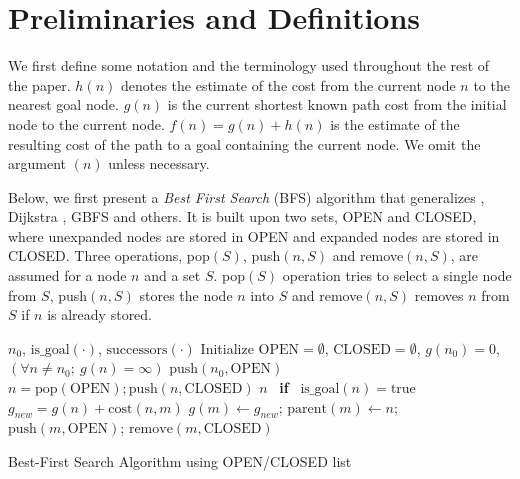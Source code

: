 \section{Preliminaries and Definitions}

\label{sec:preliminaries}

We first define some notation and the terminology used throughout the
rest of the paper.
$h(n)$ denotes the estimate of the cost from the current node $n$ to the nearest goal node.
$g(n)$ is the current shortest known path cost from the initial node to the current node.
$f(n)=g(n)+h(n)$ is the estimate of the resulting cost of the path to a goal
containing the current node.
We omit the argument $(n)$ unless necessary.

Below, we first present a \emph{Best First Search} (BFS) algorithm that generalizes \astar, Dijkstra \cite{dijkstra1959note}, GBFS and others.
It is built upon two sets, OPEN and CLOSED, where unexpanded nodes are stored in OPEN and expanded nodes are stored in CLOSED. Three operations, pop$(S)$, push$(n,S)$ and remove$(n,S)$, are assumed for a node $n$ and a set $S$.
pop$(S)$ operation tries to select a single node from $S$,
push$(n,S)$ stores the node $n$ into $S$ and remove$(n,S)$ removes $n$ from $S$ if $n$ is already stored.

\begin{algorithm}                      
\begin{algorithmic}[1]
 \REQUIRE $n_0$, $\text{is\_goal}(\cdot)$, $\text{successors}(\cdot)$ %
 \STATE Initialize $\text{OPEN}=\emptyset$, $\text{CLOSED}=\emptyset$, $g(n_0)=0$, $\left(\forall n\not=n_0;\ g(n)=\infty\right)$
 \STATE $\text{push}(n_0,\text{OPEN})$
 \STATE $n = \text{pop}(\text{OPEN}); \text{push}(n,\text{CLOSED})$
 \RETURN $n$ \  \textbf{if} \  $\text{is\_goal}(n)=\text{true}$
 \STATE $g_{new} = g(n) + \text{cost}(n,m)$
 \STATE $g(m) \leftarrow g_{new}$;\; $\text{parent}(m) \leftarrow n$;\; $\text{push}(m,\text{OPEN})$;\; $\text{remove}(m,\text{CLOSED})$
 \ENDIF
 \ENDFOR
 \ENDWHILE
\end{algorithmic}
\caption{Best-First Search Algorithm using OPEN/CLOSED list}
\label{alg:ocl}
\end{algorithm}


